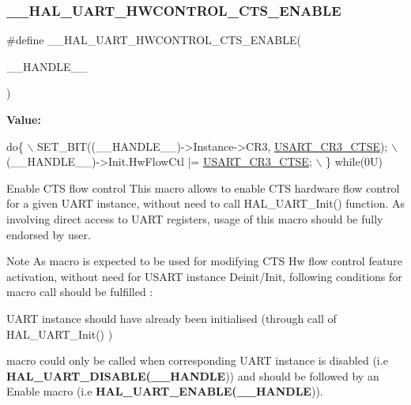 \subsubsection{\texorpdfstring{\+\_\+\+\_\+\+H\+A\+L\+\_\+\+U\+A\+R\+T\+\_\+\+H\+W\+C\+O\+N\+T\+R\+O\+L\+\_\+\+C\+T\+S\+\_\+\+E\+N\+A\+B\+LE}{\_\_HAL\_UART\_HWCONTROL\_CTS\_ENABLE}}
{\footnotesize\ttfamily \#define \+\_\+\+\_\+\+H\+A\+L\+\_\+\+U\+A\+R\+T\+\_\+\+H\+W\+C\+O\+N\+T\+R\+O\+L\+\_\+\+C\+T\+S\+\_\+\+E\+N\+A\+B\+LE(\begin{DoxyParamCaption}\item[{}]{\+\_\+\+\_\+\+H\+A\+N\+D\+L\+E\+\_\+\+\_\+ }\end{DoxyParamCaption})}

{\bfseries Value\+:}
\begin{DoxyCode}
\textcolor{keywordflow}{do}\{                                                      \(\backslash\)
    SET\_BIT((\_\_HANDLE\_\_)->Instance->CR3, \mbox{\hyperlink{group___peripheral___registers___bits___definition_gaa125f026b1ca2d76eab48b191baed265}{USART\_CR3\_CTSE}});  \(\backslash\)
    (\_\_HANDLE\_\_)->Init.HwFlowCtl |= \mbox{\hyperlink{group___peripheral___registers___bits___definition_gaa125f026b1ca2d76eab48b191baed265}{USART\_CR3\_CTSE}};        \(\backslash\)
  \} \textcolor{keywordflow}{while}(0U)
\end{DoxyCode}


Enable C\+TS flow control This macro allows to enable C\+TS hardware flow control for a given U\+A\+RT instance, without need to call H\+A\+L\+\_\+\+U\+A\+R\+T\+\_\+\+Init() function. As involving direct access to U\+A\+RT registers, usage of this macro should be fully endorsed by user. 

\begin{DoxyNote}{Note}
As macro is expected to be used for modifying C\+TS Hw flow control feature activation, without need for U\+S\+A\+RT instance Deinit/\+Init, following conditions for macro call should be fulfilled \+:
\begin{DoxyItemize}
\item U\+A\+RT instance should have already been initialised (through call of H\+A\+L\+\_\+\+U\+A\+R\+T\+\_\+\+Init() )
\item macro could only be called when corresponding U\+A\+RT instance is disabled (i.\+e {\bfseries H\+A\+L\+\_\+\+U\+A\+R\+T\+\_\+\+D\+I\+S\+A\+B\+LE(\+\_\+\+\_\+\+H\+A\+N\+D\+LE})) and should be followed by an Enable macro (i.\+e {\bfseries H\+A\+L\+\_\+\+U\+A\+R\+T\+\_\+\+E\+N\+A\+B\+LE(\+\_\+\+\_\+\+H\+A\+N\+D\+LE})). ~\newline

\end{DoxyItemize}
\end{DoxyNote}

